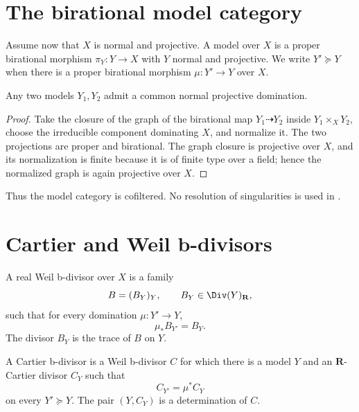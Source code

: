\section{The birational model category}
\label{sec:appF-models}

Assume now that \(X\) is normal and projective.
A model over \(X\) is a proper birational morphism
\(\pi_Y:Y\to X\) with \(Y\) normal and projective.
We write \(Y'\succeq Y\) when there is a proper birational morphism
\(\mu:Y'\to Y\) over \(X\).

\begin{lemma}\label{lem:appF-common-domination}
Any two models \(Y_1,Y_2\) admit a common normal projective domination.
\end{lemma}

\begin{proof}
Take the closure of the graph of the birational map
\(Y_1\dashrightarrow Y_2\) inside
\(Y_1\times_XY_2\), choose the irreducible component dominating \(X\), and
normalize it.
The two projections are proper and birational.  The graph closure is
projective over \(X\), and its normalization is finite because it is of
finite type over a field; hence the normalized graph is again projective
over \(X\).
\end{proof}

Thus the model category is cofiltered.
No resolution of singularities is used in
.

\section{Cartier and Weil b-divisors}
\label{sec:appF-bdivisors}

\begin{definition}
\label{def:appF-weil-bdivisor}
A real Weil b-divisor over \(X\) is a family
\[
                B=(B_Y)_Y,\qquad B_Y\in\Div(Y)_{\mathbf R},
\]
such that for every domination \(\mu:Y'\to Y\),
\[
                              \mu_*B_{Y'}=B_Y.
\tag{F.6}\label{eq:appF-weil-compatibility}
\]
The divisor \(B_Y\) is the trace of \(B\) on \(Y\).
\end{definition}

\begin{definition}
\label{def:appF-cartier-bdivisor}
A Cartier b-divisor is a Weil b-divisor \(C\) for which there is a model
\(Y\) and an \(\mathbf R\)-Cartier divisor \(C_Y\) such that
\[
                             C_{Y'}=\mu^*C_Y
\tag{F.7}\label{eq:appF-cartier-determination}
\]
on every \(Y'\succeq Y\).
The pair \((Y,C_Y)\) is a determination of \(C\).
\end{definition}

